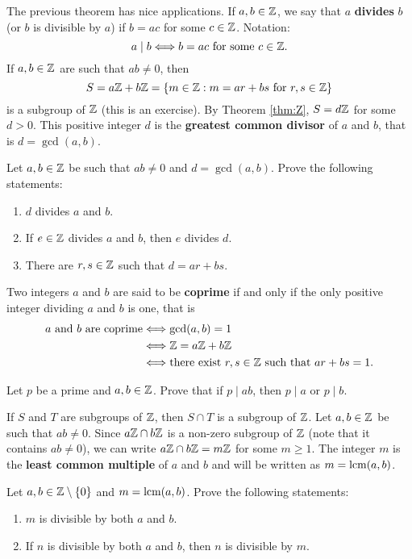 The previous theorem has nice applications. 
If $a,b\in\mathbb{Z}$, we say that $a$ \textbf{divides} $b$ (or $b$ is divisible by $a$)
if $b=ac$ for some $c\in\mathbb{Z}$. Notation: 
\[
a\mid b\Longleftrightarrow b=ac\text{ for some $c\in\mathbb{Z}$.}
\]
If $a,b\in\mathbb{Z}$ are such that $ab\ne0$, then 
\[
S=a\mathbb{Z}+b\mathbb{Z}=\{m\in\mathbb{Z}:m=ar+bs\text{ for $r,s\in\mathbb{Z}$}\}
\]
is a subgroup of $\mathbb{Z}$ (this is an exercise). 
By Theorem \ref{thm:Z}, $S=d\mathbb{Z}$ for some $d>0$. 
This positive integer $d$
is the \textbf{greatest common divisor} of $a$ and $b$, 
that is $d=\gcd(a,b)$. 

\begin{exercise}
Let $a,b\in\mathbb{Z}$ be such that $ab\ne0$ and $d=\gcd(a,b)$. 
Prove the following statements:
\begin{enumerate}
\item $d$ divides $a$ and $b$.
\item If $e\in\mathbb{Z}$ divides $a$ and $b$, then $e$ divides $d$.
\item There are $r,s\in\mathbb{Z}$ such that $d=ar+bs$.
\end{enumerate}
\end{exercise}

Two integers $a$ and $b$ are said to be \textbf{coprime} if 
and only if the only positive integer dividing 
$a$ and $b$ is one, that is  
\begin{align*}
a\text{ and }b\text{ are coprime}&\Longleftrightarrow \gcd(a,b)=1\\
&\Longleftrightarrow \mathbb{Z}=a\mathbb{Z}+b\mathbb{Z}\\
&\Longleftrightarrow \text{there exist $r,s\in\mathbb{Z}$ such that $ar+bs=1$.}
\end{align*}

\begin{exercise}
        Let $p$ be a prime and 
        $a,b\in\mathbb{Z}$. Prove that if $p\mid ab$, 
        then $p\mid a$ or $p\mid b$.
\end{exercise}

If $S$ and $T$ are subgroups of $\mathbb{Z}$, then $S\cap T$
is a subgroup of $\mathbb{Z}$.
Let $a,b\in\mathbb{Z}$ be such that $ab\ne 0$. Since $a\mathbb{Z}\cap b\mathbb{Z}$ 
is a non-zero subgroup of $\mathbb{Z}$ (note that it contains $ab\ne 0$), 
we can write  $a\mathbb{Z}\cap b\mathbb{Z}=m\mathbb{Z}$
for some $m\geq1$. The integer $m$
is the \textbf{least common multiple} of $a$ and $b$ 
and will be written as $m=\mathrm{lcm}(a,b)$.

\begin{exercise}
Let $a,b\in\mathbb{Z}\setminus\{0\}$ and $m=\mathrm{lcm}(a,b)$. 
Prove the following statements:
\begin{enumerate}
        \item $m$ is divisible by both $a$ and $b$.
        \item If $n$ is divisible by both $a$ and $b$, then 
        $n$ is divisible by $m$.
\end{enumerate}
\end{exercise}

